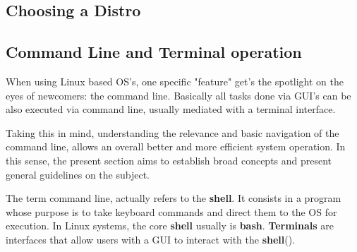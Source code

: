 \documentclass[a4paper,11pt]{article}
\begin{document}
\subsection{Choosing a Distro}
\subsection{Command Line and Terminal operation}
When using Linux based OS's, one specific "feature" get's the spotlight on the
eyes of newcomers: the command line. Basically all tasks done via GUI's can be
also executed via command line, usually mediated with a terminal interface.\par
Taking this in mind, understanding the relevance and basic navigation of the
command line, allows an overall better and more efficient system operation. In
this sense, the present section aims to establish broad concepts and present
general guidelines on the subject.
\begin{definitionbox}
    The term command line, actually refers to the \textbf{shell}. It consists in
    a program whose purpose is to take keyboard commands and direct them to the
    OS for execution. In Linux systems, the core \textbf{shell} usually is
    \textbf{bash}. \textbf{Terminals} are interfaces that allow users with a GUI to
    interact with the \textbf{shell}(\cite{shottsLinuxCommandLine2024}).
\end{definitionbox}
\end{document}
